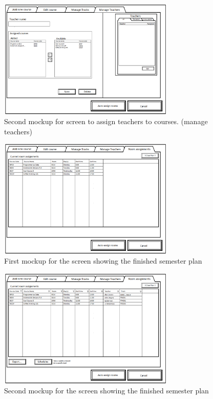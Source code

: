 \begin{figure}
\begin{center}
\leavevmode
\includegraphics[width=0.75\textwidth]{images/courseplan2_manageteachers}
\end{center}
\caption{Second mockup for screen to assign teachers to courses. (manage teachers)}
\label{fig:app2_mock2_4}
\end{figure}

\begin{figure}
\begin{center}
\leavevmode
\includegraphics[width=0.75\textwidth]{images/courseplan_Room_Assignments}
\end{center}
\caption{First mockup for the screen showing the finished semester plan}
\label{fig:app2_mock1_5}
\end{figure}

\begin{figure}
\begin{center}
\leavevmode
\includegraphics[width=0.75\textwidth]{images/courseplan2_Room_Assignments}
\end{center}
\caption{Second mockup for the screen showing the finished semester plan}
\label{fig:app2_mock2_5}
\end{figure}

